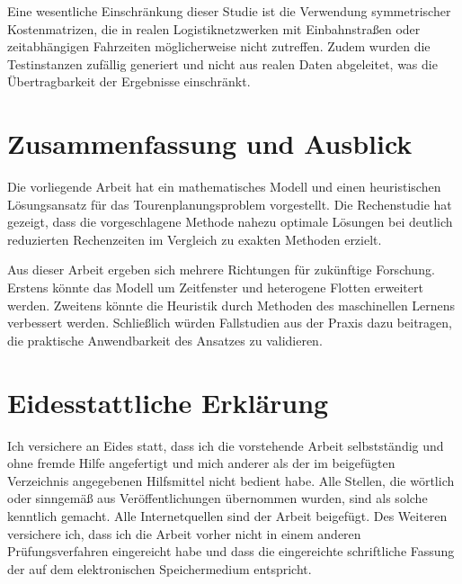 \documentclass[11pt,a4paper]{article}
\begin{document}
Eine wesentliche Einschränkung dieser Studie ist die Verwendung symmetrischer Kostenmatrizen, die in realen Logistiknetzwerken mit Einbahnstraßen oder zeitabhängigen Fahrzeiten möglicherweise nicht zutreffen. Zudem wurden die Testinstanzen zufällig generiert und nicht aus realen Daten abgeleitet, was die Übertragbarkeit der Ergebnisse einschränkt.

\section{Zusammenfassung und Ausblick}
\label{sec:zusammenfassung}
Die vorliegende Arbeit hat ein mathematisches Modell und einen heuristischen Lösungsansatz für das Tourenplanungsproblem vorgestellt. Die Rechenstudie hat gezeigt, dass die vorgeschlagene Methode nahezu optimale Lösungen bei deutlich reduzierten Rechenzeiten im Vergleich zu exakten Methoden erzielt.

Aus dieser Arbeit ergeben sich mehrere Richtungen für zukünftige Forschung. Erstens könnte das Modell um Zeitfenster und heterogene Flotten erweitert werden. Zweitens könnte die Heuristik durch Methoden des maschinellen Lernens verbessert werden. Schließlich würden Fallstudien aus der Praxis dazu beitragen, die praktische Anwendbarkeit des Ansatzes zu validieren.

\newpage
{}
\setcounter{page}{6} %
\printbibliography

\newpage
{}
\section*{Eidesstattliche Erklärung}
Ich versichere an Eides statt, dass ich die vorstehende Arbeit selbstständig und ohne fremde Hilfe angefertigt und mich anderer als der im beigefügten Verzeichnis angegebenen Hilfsmittel nicht bedient habe. Alle Stellen, die wörtlich oder sinngemäß aus Veröffentlichungen übernommen wurden, sind als solche kenntlich gemacht. Alle Internetquellen sind der Arbeit beigefügt. Des Weiteren versichere ich, dass ich die Arbeit vorher nicht in einem anderen Prüfungsverfahren eingereicht habe und dass die eingereichte schriftliche Fassung der auf dem elektronischen Speichermedium entspricht.
\end{document}
